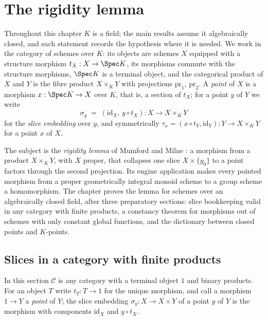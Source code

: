 \chapter{The rigidity lemma}
\label{chap:AbelianVariety}

Throughout this chapter \(K\) is a field; the main results assume it algebraically closed,
and each statement records the hypothesis where it is needed. We work in the category of
schemes over \(K\):
its objects are schemes \(X\) equipped with a structure morphism \(t_X : X \to \Spec K\), its
morphisms commute with the structure morphisms, \(\Spec K\) is a terminal object, and the
categorical product of \(X\) and \(Y\) is the fibre product \(X \times_K Y\) with projections
\(\mathrm{pr}_1\), \(\mathrm{pr}_2\). A \emph{point} of \(X\) is a morphism
\(x : \Spec K \to X\) over \(K\), that is, a section of \(t_X\); for a point \(y\) of \(Y\) we
write
\[
  \sigma_y \;=\; (\mathrm{id}_X,\, y \circ t_X) : X \longrightarrow X \times_K Y
\]
for the \emph{slice embedding} over \(y\), and symmetrically
\(\tau_x = (x \circ t_Y, \mathrm{id}_Y) : Y \to X \times_K Y\) for a point \(x\) of \(X\).

The subject is the \emph{rigidity lemma} of Mumford and Milne \cite{mumford-av,milne-av}: a morphism from a product
\(X \times_K Y\), with \(X\) proper, that collapses one slice \(X \times \{y_0\}\) to a point
factors through the second projection. Its engine application makes every pointed morphism
from a proper geometrically integral monoid scheme to a group scheme a homomorphism. The
chapter proves the lemma for schemes over an algebraically closed field, after three
preparatory sections: slice bookkeeping valid in any category with finite products, a
constancy theorem for morphisms out of schemes with only constant global functions, and the
dictionary between closed points and \(K\)-points.

\section{Slices in a category with finite products}

In this section \(\mathcal C\) is any category with a terminal object \(1\) and binary
products. For an object \(T\) write \(t_T : T \to 1\) for the unique morphism, and call a
morphism \(1 \to Y\) a \emph{point} of \(Y\); the slice embedding \(\sigma_y : X \to X \times Y\)
of a point \(y\) of \(Y\) is the morphism with components \(\mathrm{id}_X\) and
\(y \circ t_X\).

